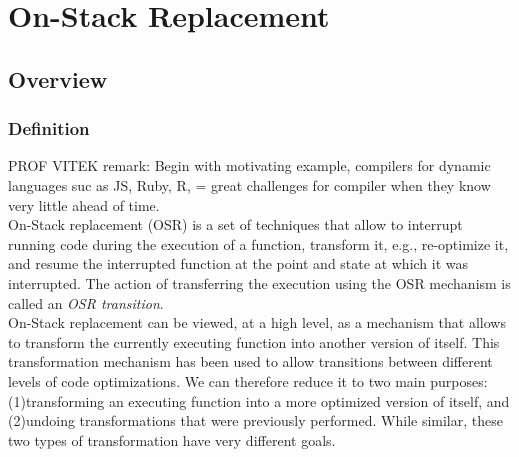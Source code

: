 
\chapter{On-Stack Replacement} %

\label{Chapter2} %


\newcommand{\keyword}[1]{\textbf{#1}}
\newcommand{\tabhead}[1]{\textbf{#1}}
\newcommand{\code}[1]{\texttt{#1}}
\newcommand{\file}[1]{\texttt{\bfseries#1}}
\newcommand{\option}[1]{\texttt{\itshape#1}}

\section{Overview}
\subsection{Definition}

PROF VITEK remark: Begin with motivating example, compilers for dynamic languages suc as JS, Ruby, R, = great challenges for compiler when they know very little ahead of time.\\

On-Stack replacement (OSR) is a set of techniques that allow to interrupt running code during the execution of a function, transform it, e.g., re-optimize it, and resume the interrupted function at the point and state at which it was interrupted.
The action of transferring the execution using the OSR mechanism is called an \textit{OSR transition}.\\

On-Stack replacement can be viewed, at a high level, as a mechanism that allows to transform the currently executing function into another version of itself.
This transformation mechanism has been used to allow transitions between different levels of code optimizations.
We can therefore reduce it to two main purposes: (1)transforming an executing function into a more optimized version of itself, and (2)undoing transformations that were previously performed.
While similar, these two types of transformation have very different goals.\\

